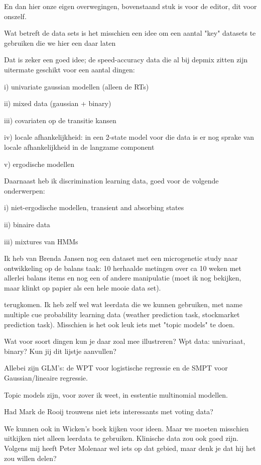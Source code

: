 En dan hier onze eigen overwegingen, bovenstaand stuk is voor de
editor, dit voor onszelf.


Wat betreft de data sets is het misschien een idee om een aantal "key"
datasets te gebruiken die we hier een daar laten

Dat is zeker een goed idee; de speed-accuracy data die al bij depmix
zitten zijn uitermate geschikt voor een aantal dingen:

i) univariate gaussian modellen (alleen de RTs)

ii) mixed data (gaussian + binary)

iii) covariaten op de transitie kansen

iv) locale afhankelijkheid: in een 2-state model voor die data is er nog sprake van locale afhankelijkheid in de langzame component

v) ergodische modellen


Daarnaast heb ik discrimination learning data, goed voor de volgende
onderwerpen:

i) niet-ergodische modellen, transient and absorbing states

ii) binaire data

iii) mixtures van HMMs

Ik heb van Brenda Jansen nog een dataset met een microgenetic study
naar ontwikkeling op de balans taak: 10 herhaalde metingen over ca 10
weken met allerlei balans items en nog een of andere manipulatie (moet
ik nog bekijken, maar klinkt op papier als een hele mooie data set).

terugkomen.  Ik heb zelf wel wat leerdata die we kunnen gebruiken, met
name multiple cue probability learning data (weather prediction task,
stockmarket prediction task).  Misschien is het ook leuk iets met
"topic models" te doen.

Wat voor soort dingen kun je daar zoal mee illustreren?
Wpt data: univariaat, binary? Kun jij dit lijstje aanvullen?

Allebei zijn GLM's: de WPT voor logistische regressie en de SMPT voor
Gaussian/lineaire regressie.

Topic models zijn, voor zover ik weet, in esstentie multinomial
modellen.

Had Mark de Rooij trouwens niet iets interessants met voting data?

We kunnen ook in Wicken's boek kijken voor ideen.  Maar we moeten
misschien uitkijken niet alleen leerdata te gebruiken.  Klinische data
zou ook goed zijn.  Volgens mij heeft Peter Molenaar wel iets op dat
gebied, maar denk je dat hij het zou willen delen?

